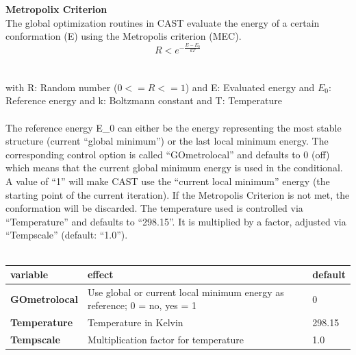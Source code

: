\documentclass[10pt,a4paper]{article} %
\begin{document}
	\textbf{Metropolix Criterion} \\
	The global optimization routines in \ac{CAST} evaluate the energy of a certain conformation (E) using the Metropolis criterion (MEC).
	\begin{equation}
	R < e^{-\frac{E-E_0}{kT}}
	\end{equation}
	\\~\\
	with R: Random number ($0 <= R <= 1$)
	and E: Evaluated energy
	and $E_0$: Reference energy
	and k: Boltzmann constant
	and T: Temperature\\~\\
	
	The reference energy E\_0 can either be the energy representing the most stable structure (current ``global minimum'') or the last local minimum energy. The corresponding control option is called ``GOmetrolocal'' and defaults to 0 (off) which means that the current global minimum energy is used in the conditional. A value of ``1'' will make \ac{CAST} use the ``current local minimum'' energy (the starting point of the current iteration). If the Metropolis Criterion is not met, the conformation will be discarded.
	The temperature used is controlled via ``Temperature'' and defaults to ``298.15''. It is multiplied by a factor, adjusted via ``Tempscale'' (default: ``1.0'').\\~\\
	
	\begin{tabularx}{\textwidth}{l|X|X}
		variable & effect & default\\
		\hline
		\textbf{GOmetrolocal} & Use global or current local minimum energy as reference; 0 = no, yes = 1 & 0 \\
		\textbf{Temperature} & Temperature in Kelvin & 298.15 \\
		\textbf{Tempscale} & Multiplication factor for temperature & 1.0
	\end{tabularx}
	
\end{document}
